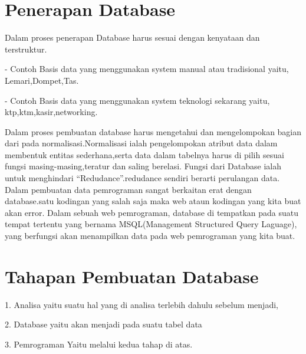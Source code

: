 \documentclass{article}
\begin{document}
\section{Penerapan Database}
\par Dalam proses penerapan Database harus sesuai dengan kenyataan dan terstruktur.
\par - Contoh Basis data yang menggunakan system manual atau        tradisional yaitu, Lemari,Dompet,Tas.
\par - Contoh Basis data yang menggunakan system teknologi         sekarang yaitu, ktp,ktm,kasir,networking.
\vspace{0,3cm}
\par Dalam proses pembuatan database harus mengetahui dan mengelompokan bagian dari pada normalisasi.Normalisasi ialah pengelompokan atribut data dalam membentuk entitas sederhana,serta data dalam tabelnya harus di pilih sesuai fungsi masing-masing,teratur dan saling berelasi.
Fungsi dari Database ialah untuk menghindari “Redudance”.redudance sendiri berarti perulangan data.
Dalam pembuatan data pemrograman sangat berkaitan erat dengan database.satu kodingan yang salah saja maka web ataun kodingan yang kita buat akan error.
Dalam sebuah web pemrograman, database di tempatkan pada suatu tempat tertentu yang bernama MSQL(Management Structured Query Laguage), yang berfungsi akan menampilkan data pada web pemrograman yang kita buat.
\section{Tahapan Pembuatan Database}
\par 1. Analisa 
yaitu suatu hal yang di analisa terlebih dahulu sebelum menjadi,
\par 2. Database
yaitu akan menjadi pada suatu tabel data
\par 3. Pemrograman
Yaitu melalui kedua tahap di atas.
\end{document}
